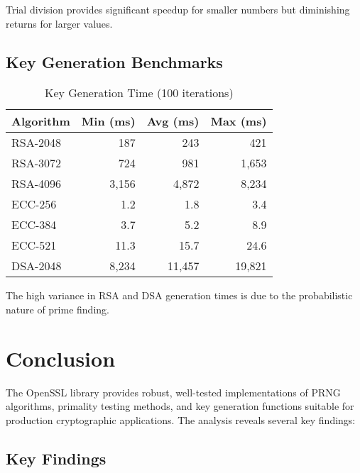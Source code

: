 Trial division provides significant speedup for smaller numbers but diminishing returns for larger values.

\subsection{Key Generation Benchmarks}

\begin{table}[ht]
    \centering
    \caption{Key Generation Time (100 iterations)}
    \begin{tabular}{|l|r|r|r|}
        \hline
        \textbf{Algorithm} & \textbf{Min (ms)} & \textbf{Avg (ms)} & \textbf{Max (ms)} \\
        \hline
        RSA-2048           & 187               & 243               & 421               \\
        RSA-3072           & 724               & 981               & 1,653             \\
        RSA-4096           & 3,156             & 4,872             & 8,234             \\
        \hline
        ECC-256            & 1.2               & 1.8               & 3.4               \\
        ECC-384            & 3.7               & 5.2               & 8.9               \\
        ECC-521            & 11.3              & 15.7              & 24.6              \\
        \hline
        DSA-2048           & 8,234             & 11,457            & 19,821            \\
        \hline
    \end{tabular}
\end{table}

The high variance in RSA and DSA generation times is due to the probabilistic nature of prime finding.

\section{Conclusion}

The OpenSSL library provides robust, well-tested implementations of PRNG algorithms, primality testing methods, and key generation functions suitable for production cryptographic applications. The analysis reveals several key findings:

\subsection{Key Findings}

